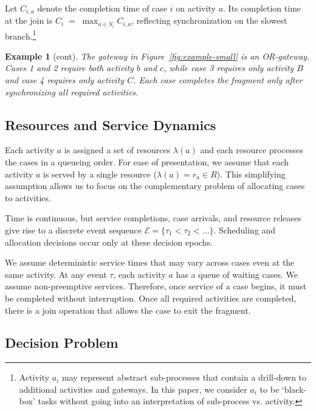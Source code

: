 \documentclass[letterpaper]{article}
\newcommand{\ag}[1]{\textcolor{green}{AG: {#1}}} %
\newtheorem{example}{Example}
\begin{document}
%





Let $C_{i,a}$ denote the completion time of case $i$ on activity $a$.
Its completion time at the join is $C_i \;=\; \max_{a \in S_i} C_{i,a}$, reflecting synchronization on the slowest branch.\footnote{Activity $a_i$ may represent abstract sub-processes that contain
a drill-down to additional activities and gateways. 
In this paper, we consider $a_i$ to be `black-box' tasks
without going into an interpretation of sub-process vs. activity.}



\setcounter{example}{0}
\begin{example}[cont]
The gateway in Figure~\ref{fig:example-small} is an OR-gateway.
Cases 1 and 2 require both activity $b$ and $c$, while case 3 requires only activity $B$ and case 4 requires only activity $C$.
Each case completes the fragment only after synchronizing all required activities.
\end{example}

\subsection{Resources and Service Dynamics}

Each activity $a$ is assigned a set of resources $\lambda(a)$ and each resource
processes the cases in a queueing order.  
For ease of presentation, we assume that 
each activity $a$ is served by a single resource ($\lambda(a) = r_a \in R$). This simplifying assumption allows us to focus on the complementary 
problem of allocating cases to activities.

Time is continuous, but service completions, case arrivals, and
resource releases give rise to a discrete event sequence
$\mathcal{E} = \{\tau_1 < \tau_2 < \dots\}$.  
Scheduling and allocation decisions occur only at these decision
epochs.

We assume deterministic service times that may vary across
cases even at the same activity.  
At any event $\tau$, each activity $a$ has a queue of waiting cases.  We assume non-preemptive services. Therefore, once service of a case begins, it must be completed without interruption.
Once all required activities are completed, there is a join operation that allows 
the case to exit the fragment.

\subsection{Decision Problem}
\end{document}
